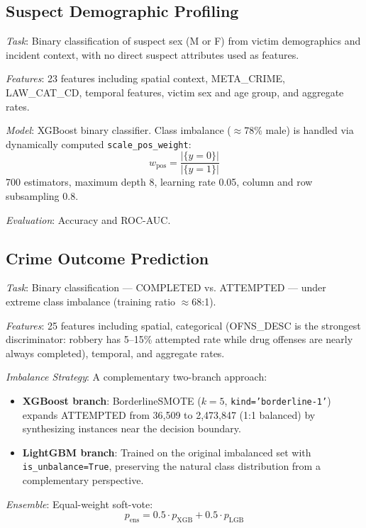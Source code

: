 \documentclass[conference]{IEEEtran}
\begin{document}
\subsection{Suspect Demographic Profiling}

\textit{Task}: Binary classification of suspect sex (M or F) from victim demographics and incident context, with no direct suspect attributes used as features.

\textit{Features}: 23 features including spatial context, META\_CRIME, LAW\_CAT\_CD, temporal features, victim sex and age group, and aggregate rates.

\textit{Model}: XGBoost \cite{chen2016} binary classifier. Class imbalance ($\approx$78\% male) is handled via dynamically computed \texttt{scale\_pos\_weight}:
\begin{equation}
  w_\text{pos} = \frac{|\{y=0\}|}{|\{y=1\}|}
\end{equation}
700 estimators, maximum depth 8, learning rate 0.05, column and row subsampling 0.8.

\textit{Evaluation}: Accuracy and ROC-AUC.

\subsection{Crime Outcome Prediction}

\textit{Task}: Binary classification — COMPLETED vs. ATTEMPTED — under extreme class imbalance (training ratio $\approx$68:1).

\textit{Features}: 25 features including spatial, categorical (OFNS\_DESC is the strongest discriminator: robbery has 5--15\% attempted rate while drug offenses are nearly always completed), temporal, and aggregate rates.

\textit{Imbalance Strategy}: A complementary two-branch approach:
\begin{itemize}
  \item \textbf{XGBoost branch}: BorderlineSMOTE \cite{han2005} ($k=5$, \texttt{kind='borderline-1'}) expands ATTEMPTED from 36,509 to 2,473,847 (1:1 balanced) by synthesizing instances near the decision boundary.
  \item \textbf{LightGBM branch}: Trained on the original imbalanced set with \texttt{is\_unbalance=True}, preserving the natural class distribution from a complementary perspective.
\end{itemize}

\textit{Ensemble}: Equal-weight soft-vote:
\begin{equation}
  p_\text{ens} = 0.5 \cdot p_\text{XGB} + 0.5 \cdot p_\text{LGB}
\end{equation}
\end{document}
